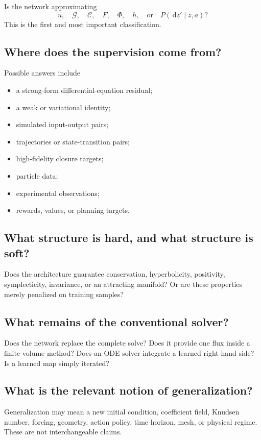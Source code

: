 \documentclass[11pt]{article}
\newcommand{\C}{\mathcal{C}}
\newcommand{\G}{\mathcal{G}}
\newcommand{\dd}{\,\mathrm{d}}
\begin{document}
Is the network approximating
\[
 u,
 \quad
 \G,
 \quad
 \C,
 \quad
 F,
 \quad
 \Phi,
 \quad
 h,
 \quad\text{or}\quad
 P(\dd z'\mid z,a)?
\]
This is the first and most important classification.

\subsection{Where does the supervision come from?}

Possible answers include
\begin{itemize}
  \item a strong-form differential-equation residual;
  \item a weak or variational identity;
  \item simulated input-output pairs;
  \item trajectories or state-transition pairs;
  \item high-fidelity closure targets;
  \item particle data;
  \item experimental observations;
  \item rewards, values, or planning targets.
\end{itemize}

\subsection{What structure is hard, and what structure is soft?}

Does the architecture guarantee conservation, hyperbolicity, positivity, symplecticity, invariance, or an attracting manifold? Or are these properties merely penalized on training samples?

\subsection{What remains of the conventional solver?}

Does the network replace the complete solve? Does it provide one flux inside a finite-volume method? Does an ODE solver integrate a learned right-hand side? Is a learned map simply iterated?

\subsection{What is the relevant notion of generalization?}

Generalization may mean a new initial condition, coefficient field, Knudsen number, forcing, geometry, action policy, time horizon, mesh, or physical regime. These are not interchangeable claims.
\end{document}
